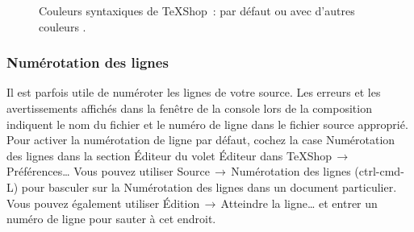 \documentclass[11pt,french]{article}
\newcommand{\TS}{\textsf{\TeX Shop}}
\newcommand{\cmd}[1]{\textsf{#1}}
\newcommand{\mnu}[1]{\textsf{#1}}
\newcommand{\To}{\,\(\to\)\,}
\begin{document}
\begin{figure}
\centering
{}%
\qquad%
%
\caption[Couleurs syntaxiques de \TS]{Couleurs syntaxiques de \TS\ : par défaut  ou avec d'autres couleurs .}
\label{fig:SyntaxColors}
\end{figure}

\subsubsection{Numérotation des lignes}

%

Il est parfois utile de numéroter les lignes de votre source. Les erreurs et les avertissements affichés dans la fenêtre de la console lors de la composition indiquent le nom du fichier et le numéro de ligne dans le fichier source approprié. Pour activer la numérotation de ligne par défaut, cochez la case \cmd{Numérotation des lignes} dans la section \cmd{Éditeur} du volet \cmd{Éditeur} dans \mnu{TeXShop}\To\mnu{Préférences…} Vous pouvez utiliser \cmd{Source}\To\mnu{Numérotation des lignes} (\cmd{ctrl-cmd-L}) pour basculer sur la \cmd{Numérotation des lignes} dans un document particulier. Vous pouvez également utiliser \mnu{Édition}\To\mnu{Atteindre la ligne…} et  entrer un numéro de ligne pour sauter à cet endroit.
\end{document}
